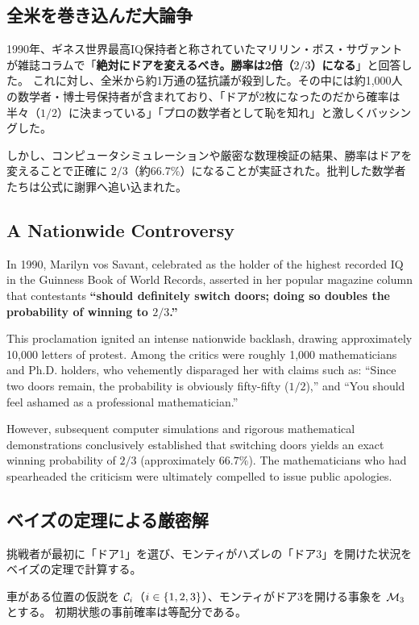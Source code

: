 \ifja
\subsection{全米を巻き込んだ大論争}
1990年、ギネス世界最高IQ保持者と称されていたマリリン・ボス・サヴァントが雑誌コラムで「\textbf{絶対にドアを変えるべき。勝率は2倍（$2/3$）になる}」と回答した。
これに対し、全米から約1万通の猛抗議が殺到した。その中には約1,000人の数学者・博士号保持者が含まれており、「ドアが2枚になったのだから確率は半々（$1/2$）に決まっている」「プロの数学者として恥を知れ」と激しくバッシングした。

しかし、コンピュータシミュレーションや厳密な数理検証の結果、勝率はドアを変えることで正確に $2/3$（約66.7\%）になることが実証された。批判した数学者たちは公式に謝罪へ追い込まれた。
\else
\subsection{A Nationwide Controversy}
In 1990, Marilyn vos Savant, celebrated as the holder of the highest recorded IQ in the Guinness Book of World Records, asserted in her popular magazine column that contestants \textbf{``should definitely switch doors; doing so doubles the probability of winning to $2/3$.''}

This proclamation ignited an intense nationwide backlash, drawing approximately 10,000 letters of protest. Among the critics were roughly 1,000 mathematicians and Ph.D. holders, who vehemently disparaged her with claims such as: ``Since two doors remain, the probability is obviously fifty-fifty ($1/2$),'' and ``You should feel ashamed as a professional mathematician.''

However, subsequent computer simulations and rigorous mathematical demonstrations conclusively established that switching doors yields an exact winning probability of $2/3$ (approximately $66.7\%$). The mathematicians who had spearheaded the criticism were ultimately compelled to issue public apologies.
\fi

\ifja
    \subsection{ベイズの定理による厳密解}
    挑戦者が最初に「ドア1」を選び、モンティがハズレの「ドア3」を開けた状況をベイズの定理で計算する。

    車がある位置の仮説を $\mathcal{C}_{i}$（$i \in \{1, 2, 3\}$）、モンティがドア3を開ける事象を $\mathcal{M}_3$ とする。
    初期状態の事前確率は等配分である。

